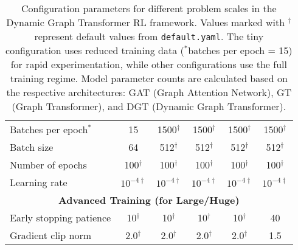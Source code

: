\begin{table}[htbp]
{\begin{tabular}{@{}l|ccccc@{}}
\midrule
Batches per epoch$^{*}$ & 15 & 1500$^{\dagger}$ & 1500$^{\dagger}$ & 1500$^{\dagger}$ & 1500$^{\dagger}$ \\
Batch size & 64 & 512$^{\dagger}$ & 512$^{\dagger}$ & 512$^{\dagger}$ & 512$^{\dagger}$ \\
Number of epochs & 100$^{\dagger}$ & 100$^{\dagger}$ & 100$^{\dagger}$ & 100$^{\dagger}$ & 100$^{\dagger}$ \\
Learning rate & $10^{-4\dagger}$ & $10^{-4\dagger}$ & $10^{-4\dagger}$ & $10^{-4\dagger}$ & $10^{-4\dagger}$ \\
\midrule
\multicolumn{6}{c}{\textbf{Advanced Training (for Large/Huge)}} \\
\midrule
Early stopping patience & 10$^{\dagger}$ & 10$^{\dagger}$ & 10$^{\dagger}$ & 10$^{\dagger}$ & 40 \\
Gradient clip norm & 2.0$^{\dagger}$ & 2.0$^{\dagger}$ & 2.0$^{\dagger}$ & 2.0$^{\dagger}$ & 1.5 \\
\bottomrule
\end{tabular}%
}
\caption{Configuration parameters for different problem scales in the Dynamic Graph Transformer RL framework. Values marked with $^{\dagger}$ represent default values from \texttt{default.yaml}. The tiny configuration uses reduced training data ($^{*}$batches per epoch = 15) for rapid experimentation, while other configurations use the full training regime. Model parameter counts are calculated based on the respective architectures: GAT (Graph Attention Network), GT (Graph Transformer), and DGT (Dynamic Graph Transformer).}
\label{tab:config_comparison}
\end{table}
